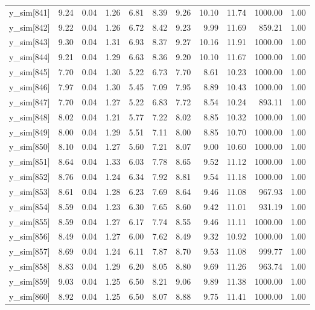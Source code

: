 \begin{table}[ht]
\begin{tabular}{rrrrrrrrrrr}
  y\_sim[841] & 9.24 & 0.04 & 1.26 & 6.81 & 8.39 & 9.26 & 10.10 & 11.74 & 1000.00 & 1.00 \\ 
  y\_sim[842] & 9.22 & 0.04 & 1.26 & 6.72 & 8.42 & 9.23 & 9.99 & 11.69 & 859.21 & 1.00 \\ 
  y\_sim[843] & 9.30 & 0.04 & 1.31 & 6.93 & 8.37 & 9.27 & 10.16 & 11.91 & 1000.00 & 1.00 \\ 
  y\_sim[844] & 9.21 & 0.04 & 1.29 & 6.63 & 8.36 & 9.20 & 10.10 & 11.67 & 1000.00 & 1.00 \\ 
  y\_sim[845] & 7.70 & 0.04 & 1.30 & 5.22 & 6.73 & 7.70 & 8.61 & 10.23 & 1000.00 & 1.00 \\ 
  y\_sim[846] & 7.97 & 0.04 & 1.30 & 5.45 & 7.09 & 7.95 & 8.89 & 10.43 & 1000.00 & 1.00 \\ 
  y\_sim[847] & 7.70 & 0.04 & 1.27 & 5.22 & 6.83 & 7.72 & 8.54 & 10.24 & 893.11 & 1.00 \\ 
  y\_sim[848] & 8.02 & 0.04 & 1.21 & 5.77 & 7.22 & 8.02 & 8.85 & 10.32 & 1000.00 & 1.00 \\ 
  y\_sim[849] & 8.00 & 0.04 & 1.29 & 5.51 & 7.11 & 8.00 & 8.85 & 10.70 & 1000.00 & 1.00 \\ 
  y\_sim[850] & 8.10 & 0.04 & 1.27 & 5.60 & 7.21 & 8.07 & 9.00 & 10.60 & 1000.00 & 1.00 \\ 
  y\_sim[851] & 8.64 & 0.04 & 1.33 & 6.03 & 7.78 & 8.65 & 9.52 & 11.12 & 1000.00 & 1.00 \\ 
  y\_sim[852] & 8.76 & 0.04 & 1.24 & 6.34 & 7.92 & 8.81 & 9.54 & 11.18 & 1000.00 & 1.00 \\ 
  y\_sim[853] & 8.61 & 0.04 & 1.28 & 6.23 & 7.69 & 8.64 & 9.46 & 11.08 & 967.93 & 1.00 \\ 
  y\_sim[854] & 8.59 & 0.04 & 1.23 & 6.30 & 7.65 & 8.60 & 9.42 & 11.01 & 931.19 & 1.00 \\ 
  y\_sim[855] & 8.59 & 0.04 & 1.27 & 6.17 & 7.74 & 8.55 & 9.46 & 11.11 & 1000.00 & 1.00 \\ 
  y\_sim[856] & 8.49 & 0.04 & 1.27 & 6.00 & 7.62 & 8.49 & 9.32 & 10.92 & 1000.00 & 1.00 \\ 
  y\_sim[857] & 8.69 & 0.04 & 1.24 & 6.11 & 7.87 & 8.70 & 9.53 & 11.08 & 999.77 & 1.00 \\ 
  y\_sim[858] & 8.83 & 0.04 & 1.29 & 6.20 & 8.05 & 8.80 & 9.69 & 11.26 & 963.74 & 1.00 \\ 
  y\_sim[859] & 9.03 & 0.04 & 1.25 & 6.50 & 8.21 & 9.06 & 9.89 & 11.38 & 1000.00 & 1.00 \\ 
  y\_sim[860] & 8.92 & 0.04 & 1.25 & 6.50 & 8.07 & 8.88 & 9.75 & 11.41 & 1000.00 & 1.00 \\ 

\end{tabular}
\end{table}
